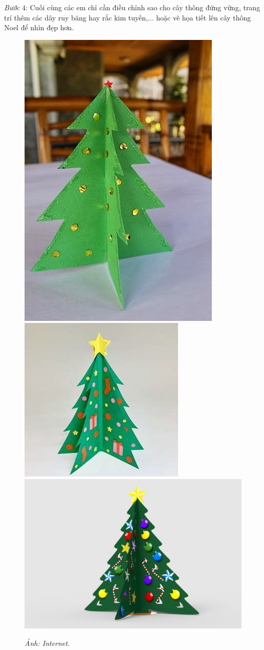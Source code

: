 \begin{multicols}{2}
\begin{figure}[H]
		\vspace*{-15pt}
	\end{figure}
	\textit{Bước} $4$: Cuối cùng các em chỉ cần điều chỉnh sao cho cây thông đứng vững, trang trí thêm các dây ruy băng hay rắc kim tuyến,... hoặc vẽ họa tiết lên cây thông Noel để nhìn đẹp hơn.
	\begin{figure}[H]
		\vspace*{-5pt}
		\centering
		\captionsetup{labelformat= empty, justification=centering}
		\includegraphics[height= 0.31\linewidth]{9a}
		\includegraphics[height= 0.31\linewidth]{9b}
		\includegraphics[height= 0.31\linewidth]{9c}
		\caption{\small\textit{\color{toancuabi}Ảnh: Internet.}}
		\vspace*{-10pt}
	\end{figure}
\end{multicols}

